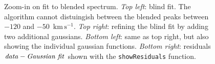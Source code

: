 \documentclass[11pt,a4paper]{article}
\newcommand\kms{$\mathrm{km} \, \mathrm{s}^{-1}$}
\begin{document}
\begin{figure}[h!]
  \caption{Zoom-in on fit to blended spectrum. \emph{Top left}: blind
    fit. The algorithm cannot distuingish between the blended peaks
    between $-120$ and $-50$~\kms. \emph{Top right}: refining the
    blind fit by adding two additional gaussians. \emph{Bottom left}:
    same as top right, but also showing the individual gaussian
    functions. \emph{Bottom right}: residuals $\mbox{\emph{data}} -
    \mbox{\emph{Gaussian fit}}$ shown with the \texttt{showResiduals}
    function.}
  \label{fig6}
\end{figure}
\end{document}
